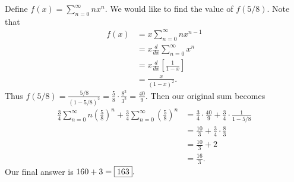 \documentclass[letterpaper,oneside]{book}
\begin{document}
Define $f(x) = \sum_{n=0}^\infty nx^n.$ We would like to find the value of $f(5/8).$ Note that
\begin{align*}
    f(x) & = x\sum_{n=0}^{\infty} nx^{n-1}            \\
         & = x \frac{d}{dx}\sum_{n=0}^{\infty} x^n    \\
         & = x \frac{d}{dx}\left[\frac{1}{1-x}\right] \\
         & = \frac{x}{(1-x)^2}.
\end{align*}
Thus $\displaystyle f(5/8)= \frac{5/8}{(1-5/8)^2} = \frac58 \cdot \frac{8^2}{3^2} = \frac{40}{9}.$ Then our original sum becomes
\begin{align*}
    \frac34 \sum_{n=0}^{\infty} n\left(\frac58\right)^n + \frac34\sum_{n=0}^{\infty} \left(\frac58\right)^n & = \frac34\cdot\frac{40}{9}+\frac34\cdot\frac{1}{1-5/8} \\
                                                                                                            & = \frac{10}{3} + \frac{3}{4}\cdot\frac{8}{3}           \\
                                                                                                            & = \frac{10}{3} + 2                                     \\
                                                                                                            & = \frac{16}{3}.
\end{align*}
Our final answer is $160+3 = \fbox{163}.$
\end{document}
